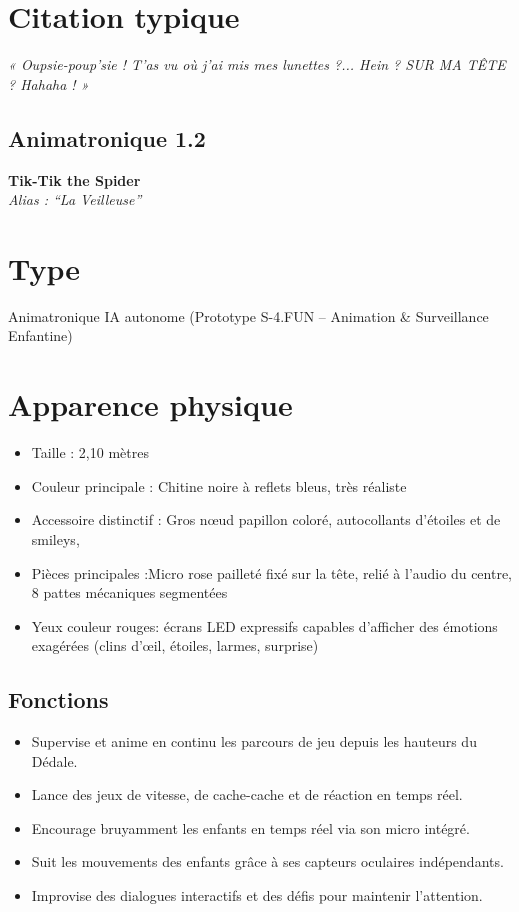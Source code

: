 \section*{Citation typique}
\textit{« Oupsie-poup’sie ! T’as vu où j’ai mis mes lunettes ?... Hein ? SUR MA TÊTE ? Hahaha ! »}

\subsection{Animatronique 1.2}

\textbf{Tik-Tik the Spider}\\
\textit{Alias : “La Veilleuse”}

\section*{Type}
Animatronique IA autonome (Prototype S-4.FUN – Animation \& Surveillance Enfantine)

\section*{Apparence physique}
\begin{itemize}[noitemsep]
  \item Taille : 2,10 mètres
  \item Couleur principale : Chitine noire à reflets bleus, très réaliste
  \item Accessoire distinctif : Gros nœud papillon coloré, autocollants d’étoiles et de smileys,
  \item Pièces principales :Micro rose pailleté fixé sur la tête, relié à l’audio du centre, 8 pattes mécaniques segmentées
  \item Yeux couleur rouges: écrans LED expressifs capables d’afficher des émotions exagérées (clins d’œil, étoiles, larmes, surprise)
\end{itemize}

\subsection*{Fonctions}
\begin{itemize}[noitemsep]
  \item Supervise et anime en continu les parcours de jeu depuis les hauteurs du Dédale.
  \item Lance des jeux de vitesse, de cache-cache et de réaction en temps réel.
  \item Encourage bruyamment les enfants en temps réel via son micro intégré.
  \item Suit les mouvements des enfants grâce à ses capteurs oculaires indépendants.
  \item Improvise des dialogues interactifs et des défis pour maintenir l'attention.
\end{itemize}

